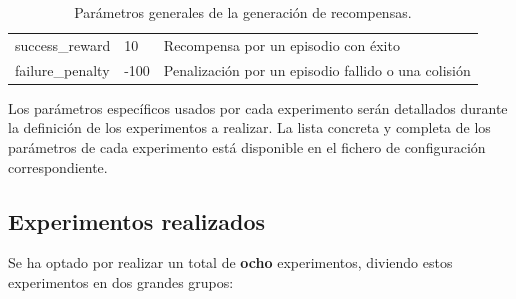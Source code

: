 \begin{table}[h]
{\begin{tabular}{@{}lll@{}}
success\_reward                                                                    & 10    & Recompensa por un episodio con éxito                                                                                                                                                                             \\
failure\_penalty                                                                   & -100  & Penalización por un episodio fallido o una colisión                                                                                                                                                              \\ \bottomrule
\end{tabular}%
}
\caption{Parámetros generales de la generación de recompensas.}
\label{tab:rewardparam}
\end{table}

Los parámetros específicos usados por cada experimento serán detallados durante la definición de los experimentos a realizar. La lista concreta y completa de los parámetros de cada experimento está disponible en el fichero de configuración correspondiente.

\subsection{Experimentos realizados}

Se ha optado por realizar un total de \textbf{ocho} experimentos, diviendo estos experimentos en dos grandes grupos:

